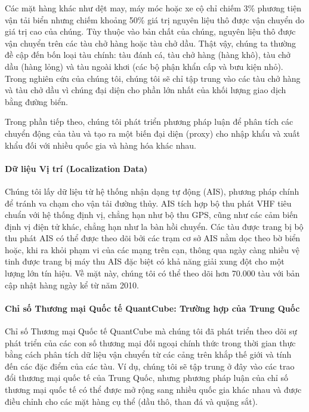 Các mặt hàng khác như dệt may, máy móc hoặc xe cộ chỉ chiếm 3\% phương tiện vận tải biển nhưng chiếm khoảng 50\% giá trị nguyên liệu thô được vận chuyển do giá trị cao của chúng. Tùy thuộc vào bản chất của chúng, nguyên liệu thô được vận chuyển trên các tàu chở hàng hoặc tàu chở dầu. Thật vậy, chúng ta thường đề cập đến bốn loại tàu chính: tàu đánh cá, tàu chở hàng (hàng khô), tàu chở dầu (hàng lỏng) và tàu ngoài khơi (các bộ phận khẩn cấp và bưu kiện nhỏ). Trong nghiên cứu của chúng tôi, chúng tôi sẽ chỉ tập trung vào các tàu chở hàng và tàu chở dầu vì chúng đại diện cho phần lớn nhất của khối lượng giao dịch bằng đường biển.

Trong phần tiếp theo, chúng tôi phát triển phương pháp luận để phân tích các chuyển động của tàu và tạo ra một biến đại diện (proxy) cho nhập khẩu và xuất khẩu đối với nhiều quốc gia và hàng hóa khác nhau.

\paragraph{Dữ liệu Vị trí (Localization Data)}
Chúng tôi lấy dữ liệu từ hệ thống nhận dạng tự động (AIS), phương pháp chính để tránh va chạm cho vận tải đường thủy. AIS tích hợp bộ thu phát VHF tiêu chuẩn với hệ thống định vị, chẳng hạn như bộ thu GPS, cũng như các cảm biến định vị điện tử khác, chẳng hạn như la bàn hồi chuyển. Các tàu được trang bị bộ thu phát AIS có thể được theo dõi bởi các trạm cơ sở AIS nằm dọc theo bờ biển hoặc, khi ra khỏi phạm vi của các mạng trên cạn, thông qua ngày càng nhiều vệ tinh được trang bị máy thu AIS đặc biệt có khả năng giải xung đột cho một lượng lớn tín hiệu. Về mặt này, chúng tôi có thể theo dõi hơn 70.000 tàu với bản cập nhật hàng ngày kể từ năm 2010.

\paragraph{Chỉ số Thương mại Quốc tế QuantCube: Trường hợp của Trung Quốc}
Chỉ số Thương mại Quốc tế QuantCube mà chúng tôi đã phát triển theo dõi sự phát triển của các con số thương mại đối ngoại chính thức trong thời gian thực bằng cách phân tích dữ liệu vận chuyển từ các cảng trên khắp thế giới và tính đến các đặc điểm của các tàu. Ví dụ, chúng tôi sẽ tập trung ở đây vào các trao đổi thương mại quốc tế của Trung Quốc, nhưng phương pháp luận của chỉ số thương mại quốc tế có thể được mở rộng sang nhiều quốc gia khác nhau và được điều chỉnh cho các mặt hàng cụ thể (dầu thô, than đá và quặng sắt).

